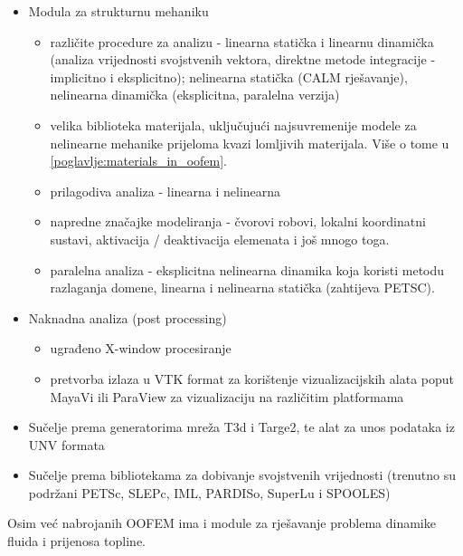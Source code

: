 \documentclass[a4paper,twoside,12pt]{memoir} %
\begin{document}
\begin{itemize}
\begin{itemize}
    \end{itemize}
    \item Modula za strukturnu mehaniku
        \begin{itemize}
            \item različite procedure za analizu - linearna statička i linearnu dinamička (analiza vrijednosti svojstvenih vektora, direktne metode integracije - implicitno i eksplicitno); nelinearna statička (CALM rješavanje), nelinearna dinamička (eksplicitna, paralelna verzija)
            \item velika biblioteka materijala, uključujući najsuvremenije modele za nelinearne mehanike prijeloma kvazi lomljivih materijala. Više o tome u \ref{poglavlje:materials_in_oofem}.
            \item prilagodiva analiza - linearna i nelinearna 
            \item napredne značajke modeliranja - čvorovi robovi, lokalni koordinatni sustavi, aktivacija / deaktivacija elemenata i još mnogo toga.
            \item paralelna analiza - eksplicitna nelinearna dinamika koja koristi metodu razlaganja domene, linearna i nelinearna statička (zahtijeva PETSC).
        \end{itemize}
    \item Naknadna analiza (post processing)
        \begin{itemize}
            \item ugrađeno X-window procesiranje
            \item pretvorba izlaza u VTK format za korištenje vizualizacijskih alata poput MayaVi ili ParaView za vizualizaciju na različitim platformama
        \end{itemize}
    \item Sučelje prema generatorima mreža T3d i Targe2, te alat za unos podataka iz UNV formata
    \item Sučelje prema bibliotekama za dobivanje svojstvenih vrijednosti (trenutno su podržani PETSc, SLEPc, IML, PARDISo, SuperLu i SPOOLES) 
\end{itemize}
Osim već nabrojanih OOFEM ima i module za rješavanje problema dinamike fluida i prijenosa topline.
\end{document}
